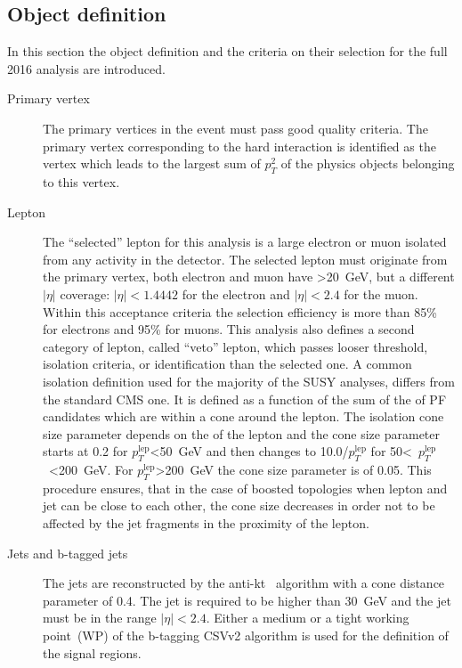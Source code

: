 
\subsection{Object definition~\label{sec:objects}}


In this section the object definition and the criteria on their selection for the full 2016 analysis are introduced.

\begin{description}
\item[Primary vertex]
The primary vertices in the event must pass good quality criteria. The primary vertex corresponding to the hard interaction is identified as the vertex which leads to the largest sum of $p_{T}^{2}$ of the physics objects belonging to this vertex.

\item[Lepton]
The ``selected'' lepton for this analysis is a large \pt electron or muon isolated from any activity in the detector. The selected lepton must originate from the primary vertex, both electron and muon have \pt>20~GeV, but a different $|\eta|$ coverage: $|\eta|<1.4442$ for the electron and $|\eta|<2.4$ for the muon. Within this acceptance criteria the selection efficiency is more than 85\% for electrons and 95\% for muons. This analysis also defines a second category of lepton, called ``veto'' lepton, which passes looser  \pt threshold, isolation criteria, or identification than the selected one. A common isolation definition used for the majority of the SUSY analyses, differs from the standard CMS one. It is defined as a function of the sum of the \pt of PF candidates which are within a cone around the lepton. The isolation cone size parameter depends on the \pt of the lepton and the cone size parameter  starts at 0.2 for $p_{T}^{\mathrm{lep}}$<50~GeV and then changes to 10.0/$p_{T}^{\mathrm{lep}}$ for  50<~$p_{T}^{\mathrm{lep}}$~<200~GeV. For $p_{T}^{\mathrm{lep}}$>200~GeV the cone size parameter is of 0.05. This procedure ensures, that in the case of boosted topologies when lepton and jet can be close to each other, the cone size decreases in order not to be affected by the jet fragments in the proximity of the lepton.   

\item[Jets and b-tagged jets]
The jets are reconstructed by the anti-kt~\cite{Cacciari:2008gp} algorithm with a cone distance parameter of 0.4. The jet \pt is required to be higher than 30~GeV and the jet must be in the range $|\eta|<2.4$. Either a medium or a tight working point~(WP) of the b-tagging CSVv2 algorithm is used for the definition of the signal regions.  


\end{description}
